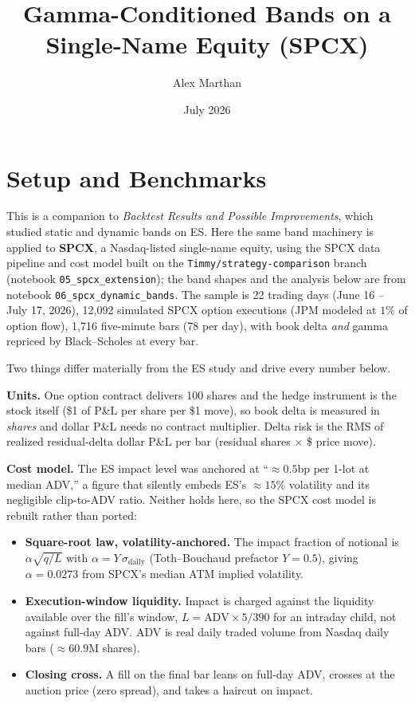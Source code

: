 \documentclass[11pt]{article}
\title{Gamma-Conditioned Bands on a Single-Name Equity (SPCX)}
\author{Alex Marthan}
\date{July 2026}
\begin{document}
\maketitle

\section{Setup and Benchmarks}

This is a companion to \emph{Backtest Results and Possible Improvements}, which studied
static and dynamic bands on ES. Here the same band machinery is applied to \textbf{SPCX},
a Nasdaq-listed single-name equity, using the SPCX data pipeline and cost model built on
the \texttt{Timmy/strategy-comparison} branch (notebook
\texttt{05\_spcx\_extension}); the band shapes and the analysis below are from notebook
\texttt{06\_spcx\_dynamic\_bands}. The sample is 22 trading days
(June 16 -- July 17, 2026), 12{,}092 simulated SPCX option executions (JPM modeled at
$1\%$ of option flow), 1{,}716 five-minute bars (78 per day), with book delta \emph{and}
gamma repriced by Black--Scholes at every bar.

Two things differ materially from the ES study and drive every number below.

\textbf{Units.} One option contract delivers 100 shares and the hedge instrument is the
stock itself (\$1 of P\&L per share per \$1 move), so book delta is measured in
\emph{shares} and dollar P\&L needs no contract multiplier. Delta risk is the RMS of
realized residual-delta dollar P\&L per bar (residual shares $\times$ \$ price move).

\textbf{Cost model.} The ES impact level was anchored at ``$\approx0.5$bp per 1-lot at
median ADV,'' a figure that silently embeds ES's $\approx15\%$ volatility and its
negligible clip-to-ADV ratio. Neither holds here, so the SPCX cost model is rebuilt
rather than ported:
\begin{itemize}
\item \textbf{Square-root law, volatility-anchored.} The impact fraction of notional is
  $\alpha\sqrt{q/L}$ with $\alpha = Y\,\sigma_{\text{daily}}$ (Toth--Bouchaud prefactor
  $Y = 0.5$), giving $\alpha = 0.0273$ from SPCX's median ATM implied volatility.
\item \textbf{Execution-window liquidity.} Impact is charged against the liquidity
  available over the fill's window, $L = \text{ADV}\times 5/390$ for an intraday child,
  not against full-day ADV. ADV is real daily traded volume from Nasdaq daily bars
  ($\approx60.9$M shares).
\item \textbf{Closing cross.} A fill on the final bar leans on full-day ADV, crosses at
  the auction price (zero spread), and takes a haircut on impact.
\end{itemize}
\end{document}
